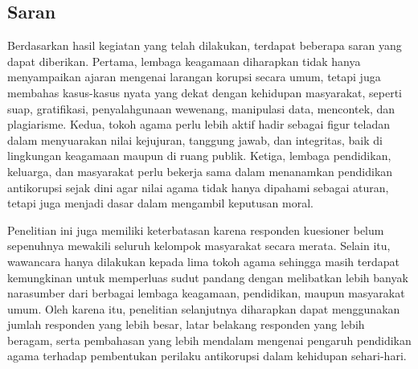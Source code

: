 \subsection{Saran}
Berdasarkan hasil kegiatan yang telah dilakukan, terdapat beberapa saran yang dapat diberikan. Pertama, lembaga keagamaan diharapkan tidak hanya menyampaikan ajaran mengenai larangan korupsi secara umum, tetapi juga membahas kasus-kasus nyata yang dekat dengan kehidupan masyarakat, seperti suap, gratifikasi, penyalahgunaan wewenang, manipulasi data, mencontek, dan plagiarisme. Kedua, tokoh agama perlu lebih aktif hadir sebagai figur teladan dalam menyuarakan nilai kejujuran, tanggung jawab, dan integritas, baik di lingkungan keagamaan maupun di ruang publik. Ketiga, lembaga pendidikan, keluarga, dan masyarakat perlu bekerja sama dalam menanamkan pendidikan antikorupsi sejak dini agar nilai agama tidak hanya dipahami sebagai aturan, tetapi juga menjadi dasar dalam mengambil keputusan moral.

Penelitian ini juga memiliki keterbatasan karena responden kuesioner belum sepenuhnya mewakili seluruh kelompok masyarakat secara merata. Selain itu, wawancara hanya dilakukan kepada lima tokoh agama sehingga masih terdapat kemungkinan untuk memperluas sudut pandang dengan melibatkan lebih banyak narasumber dari berbagai lembaga keagamaan, pendidikan, maupun masyarakat umum. Oleh karena itu, penelitian selanjutnya diharapkan dapat menggunakan jumlah responden yang lebih besar, latar belakang responden yang lebih beragam, serta pembahasan yang lebih mendalam mengenai pengaruh pendidikan agama terhadap pembentukan perilaku antikorupsi dalam kehidupan sehari-hari.
